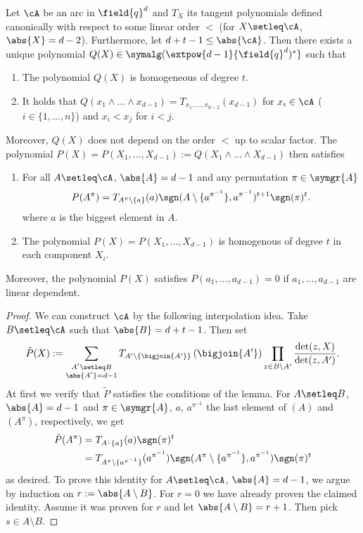 \begin{lemma}
  Let $\cA$ be an arc in $\field{q}^d$ and $T_X$ its tangent polynomials
  defined canonically with respect to some linear order $<$ (for
  $X\setleq \cA$, $\abs{X}=d-2$). Furthermore, let $d+t-1\leq
  \abs{\cA}$. Then there exists a unique polynomial $Q(X)\in
  \symalg(\extpow{d-1}{\field{q}^d)^*}$ such that
  \begin{enumerate}
  \item The polynomial $Q(X)$ is homogeneous of degree $t$.
  \item It holds that $Q(x_1\wedge\ldots\wedge
    x_{d-1})=T_{x_1,\ldots,x_{d-2}}(x_{d-1})$ for $x_i\in \cA$
    ($i\in\{1,\ldots,n\}$) and $x_i<x_j$ for $i<j$.
  \end{enumerate}

  Moreover, $Q(X)$ does not depend on the order $<$ up to scalar factor.
  The polynomial $P(X)=P(X_1,\ldots,X_{d-1}):=Q(X_1\wedge\ldots\wedge
  X_{d-1})$ then satisfies

  \begin{enumerate}
  \item For all $A\setleq \cA$, $\abs{A}=d-1$ and any permutation $\pi\in\symgr{A}$
    \begin{align}
      P(A^\pi)=T_{A^\pi\setminus\{a\}}(a)\sgn(A\setminus\{a^{\pi^{-1}}\},a^{\pi^{-1}})^{t+1}\sgn(\pi)^t\text{.}
    \end{align}
    where $a$ is the biggest element in $A$.
  \item The polynomial $P(X)=P(X_1,\ldots,X_{d-1})$ is homogenous of
    degree $t$ in each component $X_i$.
  \end{enumerate}
  Moreover, the polynomial $P(X)$ satisfies $P(a_1,\ldots,a_{d-1})=0$ if
  $a_1,\ldots,a_{d-1}$ are linear dependent.
\end{lemma}

\begin{proof}
  We can construct $\cA$ by the following interpolation idea. Take
  $B\setleq \cA$ such that $\abs{B}=d+t-1$. Then set
  \begin{align}
    \tilde{P}(X):=\sum_{\substack{A'\setleq B\\
        \abs{A'}=d-1}}{T_{A'\setminus\{\bigjoin{A'}\}}\left(\bigjoin{A'}\right)\prod_{z\in
        B\setminus A'}{\frac{\det(z,X)}{\det(z,A')}}}\text{.}
  \end{align}
  At first we verify that $\tilde{P}$ satisfies the conditions of the
  lemma. For $A\setleq B$, $\abs{A}=d-1$ and $\pi\in\symgr{A}$, $a$, $a^{\pi^{-1}}$
  the last element of $(A)$ and $(A^\pi)$, respectively, we get
  \begin{align}
    \tilde{P}(A^\pi)
    &= T_{A^\setminus\{a\}}(a)\sgn(\pi)^t\\
    &= T_{A^\pi\setminus\{a^{\pi^{-1}}\}}(a^{\pi^{-1}})\sgn(A^\pi\setminus\{a^{\pi^{-1}}\},a^{\pi^{-1}})\sgn(\pi)^t
  \end{align}
  as desired. To prove this identity for $A\setleq \cA$, $\abs{A}=d-1$,
  we argue by induction on $r:=\abs{A\setminus B}$. For $r=0$ we have
  already proven the claimed identity. Assume it was proven for $r$ and
  let $\abs{A\setminus B}=r+1$. Then pick $s\in A\setminus B$.
\end{proof}
